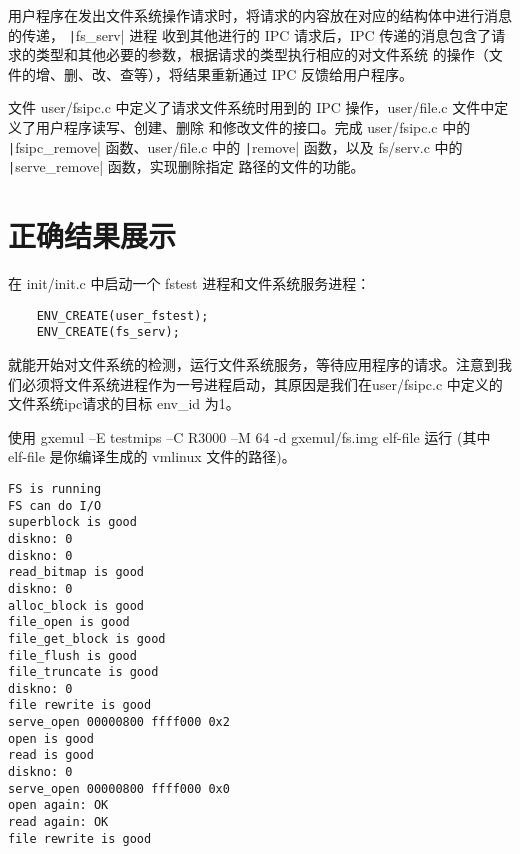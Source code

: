 用户程序在发出文件系统操作请求时，将请求的内容放在对应的结构体中进行消息的传递， \texttt|fs_serv| 进程
收到其他进行的 IPC 请求后，IPC 传递的消息包含了请求的类型和其他必要的参数，根据请求的类型执行相应的对文件系统
的操作（文件的增、删、改、查等），将结果重新通过 IPC 反馈给用户程序。

\begin{exercise}
文件 user/fsipc.c 中定义了请求文件系统时用到的 IPC 操作，user/file.c 文件中定义了用户程序读写、创建、删除
和修改文件的接口。完成 user/fsipc.c 中的 \texttt|fsipc_remove| 函数、user/file.c 中的
\texttt|remove| 函数，以及 fs/serv.c 中的 \texttt|serve_remove| 函数，实现删除指定
路径的文件的功能。
\end{exercise}

%

\section{正确结果展示}

在 init/init.c 中启动一个 fstest 进程和文件系统服务进程：

\begin{verbatim}
    ENV_CREATE(user_fstest);
    ENV_CREATE(fs_serv);
\end{verbatim}

就能开始对文件系统的检测，运行文件系统服务，等待应用程序的请求。注意到我们必须将文件系统进程作为一号进程启动，其原因是我们在user/fsipc.c 中定义的文件系统ipc请求的目标 env\_id 为1。

\begin{note}
使用 gxemul –E testmips –C R3000 –M 64 -d gxemul/fs.img elf-file 运行 (其中 elf-file 是你编译生成的 vmlinux 文件的路径)。 
\end{note}

\begin{verbatim}
FS is running
FS can do I/O
superblock is good
diskno: 0
diskno: 0
read_bitmap is good
diskno: 0
alloc_block is good
file_open is good
file_get_block is good
file_flush is good
file_truncate is good
diskno: 0
file rewrite is good
serve_open 00000800 ffff000 0x2
open is good
read is good
diskno: 0
serve_open 00000800 ffff000 0x0
open again: OK
read again: OK
file rewrite is good
\end{verbatim}

